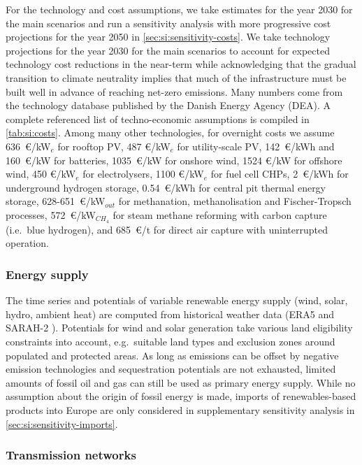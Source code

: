 For the technology and cost assumptions, we take estimates for the year
2030 for the main scenarios and run a sensitivity analysis with more progressive
cost projections for the year 2050 in \cref{sec:si:sensitivity-costs}. We take
technology projections for the year 2030 for the main scenarios to account for
expected technology cost reductions in the near-term while acknowledging that
the gradual transition to climate neutrality implies that much of the
infrastructure must be built well in advance of reaching net-zero emissions.
Many numbers come from the technology database published by the Danish Energy
Agency (DEA).\cite{DEA} A complete referenced list of techno-economic
assumptions is compiled in \cref{tab:si:costs}. Among many other technologies,
for overnight costs we assume 636~\euro/kW$_e$ for rooftop PV, 487 \euro/kW$_e$
for utility-scale PV, 142~\euro/kWh and 160~\euro/kW for batteries,
1035~\euro/kW for onshore wind, 1524 \euro/kW for offshore wind, 450
\euro/kW$_e$ for electrolysers, 1100 \euro/kW$_e$ for fuel cell CHPs,
2~\euro/kWh for underground hydrogen storage, 0.54~\euro/kWh for central pit
thermal energy storage, 628-651~\euro/kW$_{out}$ for methanation,
methanolisation and Fischer-Tropsch processes, 572~\euro/kW$_{CH_4}$ for steam
methane reforming with carbon capture (i.e.~blue hydrogen), and 685~\euro/t for
direct air capture with uninterrupted operation.

\subsubsection*{Energy supply}

The time series and potentials of variable renewable energy supply
(wind, solar, hydro, ambient heat) are computed from historical weather data
(ERA5 \cite{ecmwf} and SARAH-2 \cite{SARAH}). Potentials for wind and solar
generation take various land eligibility constraints into account, e.g.~suitable
land types and exclusion zones around populated and protected areas. As long as
emissions can be offset by negative emission technologies and sequestration
potentials are not exhausted, limited amounts of fossil oil and gas can still be
used as primary energy supply. While no assumption about the origin of fossil
energy is made, imports of renewables-based products into Europe are only
considered in supplementary sensitivity analysis in \cref{sec:si:sensitivity-imports}.

\subsubsection*{Transmission networks}

